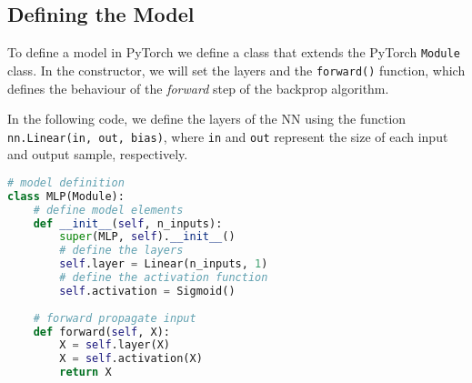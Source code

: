 \subsection{Defining the Model}%
  \label{sub:Defining the Model}
  To define a model in PyTorch we define a class that extends the PyTorch \texttt{Module} class. In the constructor, we will set the layers and the \texttt{forward()} function, which defines the behaviour of the \textit{forward} step of the backprop algorithm.

  In the following code, we define the layers of the NN using the function \texttt{nn.Linear(in, out, bias)}, where \texttt{in} and \texttt{out} represent the size of each input and output sample, respectively. 
\begin{lstlisting}[language=python]
  # model definition
class MLP(Module):
    # define model elements
    def __init__(self, n_inputs):
        super(MLP, self).__init__()
        # define the layers
        self.layer = Linear(n_inputs, 1)
        # define the activation function 
        self.activation = Sigmoid()
 
    # forward propagate input
    def forward(self, X):
        X = self.layer(X)
        X = self.activation(X)
        return X
  \end{lstlisting}
